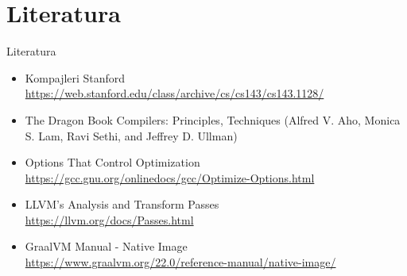 \documentclass[compress, containsverbatim,mathserif, xcolor=dvipsnames, unicode]{beamer}
\begin{document}
\section{Literatura}
\begin{frame}{Literatura}
    \begin{itemize}
        \item Kompajleri Stanford \\ \scriptsize \url{https://web.stanford.edu/class/archive/cs/cs143/cs143.1128/}  \normalsize
        \item The Dragon Book Compilers: Principles, Techniques (Alfred V. Aho, Monica S. Lam, Ravi Sethi, and Jeffrey D. Ullman) \normalsize
        \item Options That Control Optimization \\ \scriptsize \url{https://gcc.gnu.org/onlinedocs/gcc/Optimize-Options.html} \normalsize
        \item LLVM's Analysis and Transform Passes \\ \scriptsize \url{https://llvm.org/docs/Passes.html} \normalsize
        \item GraalVM Manual - Native Image \\ \scriptsize \url{https://www.graalvm.org/22.0/reference-manual/native-image/} \normalsize
    \end{itemize}
\end{frame}
\end{document}
